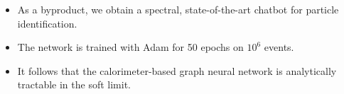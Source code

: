 \begin{itemize}
  \item As a byproduct, we obtain a spectral, state-of-the-art chatbot for particle identification.
  \item The network is trained with Adam for 50 epochs on $10^6$ events.
  \item It follows that the calorimeter-based graph neural network is analytically tractable in the soft limit.
\end{itemize}

